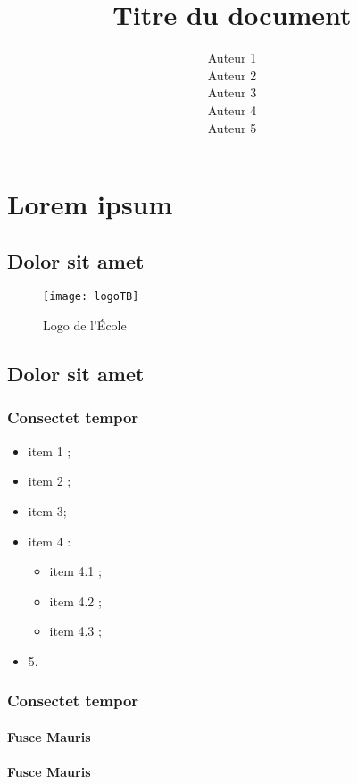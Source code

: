 \documentclass[12pt,a4paper]{article}
\author{Auteur 1\\Auteur 2\\Auteur 3\\Auteur 4\\Auteur 5}
\title{Titre du document}
\begin{document}
\TBfrontcover

\TBsommaire
\listoffigures  %
\listoftables   %
\newpage
\section{Lorem ipsum}
\subsection{Dolor sit amet}
\lipsum[1]
\begin{wrapfigure}[15]{r}{6 cm}
	\centering
	\texttt{[image: logoTB]}
	\caption{Logo de l'École}
\end{wrapfigure} \lipsum[1-5]

\subsection{Dolor sit amet}
\subsubsection{Consectet tempor}
\lipsum[1]
\begin{itemize}
	\item item 1 ;
	\item item 2 ;
	\item item 3;
	\item item 4 : 
		\begin{itemize}
			\item item 4.1 ;
			\item item 4.2 ;
			\item item 4.3 ;
		\end{itemize}
	\item 5.
\end{itemize}
\lipsum[1]

\subsubsection{Consectet tempor}
\paragraph{Fusce Mauris}
\lipsum[1]
\paragraph{Fusce Mauris}
\lipsum[1]
\end{document}
